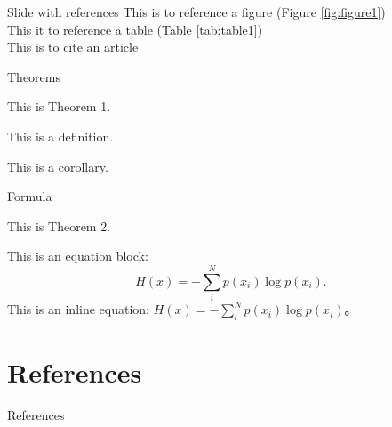 \documentclass{beamer}
\begin{document}
    \begin{frame}{Slide with references}
        This is to reference a figure (Figure \ref{fig:figure1})\\
        This it to reference a table (Table \ref{tab:table1})\\
        This is to cite an article \cite{vaswani2017attention}\\
    \end{frame}

    \begin{frame}{Theorems}
        \begin{theorem}
            This is Theorem 1.
        \end{theorem}
        \begin{definition}
            This is a definition. 
        \end{definition}
        \begin{corollary}
            This is a corollary. 
        \end{corollary}
    \end{frame}

    \begin{frame}{Formula}
        \begin{theorem}
            This is Theorem 2. 
        \end{theorem}
        This is an equation block: 
        \begin{equation}
            H(x)=-\sum\limits_i^Np(x_i)\log p(x_i).
        \end{equation}
        This is an inline equation: $H(x)=-\sum\limits_i^Np(x_i)\log p(x_i)$。
    \end{frame}

    \section{References}

    \begin{frame}[allowframebreaks]{References}
        \printbibliography[heading=none]
    \end{frame}
\end{document}
